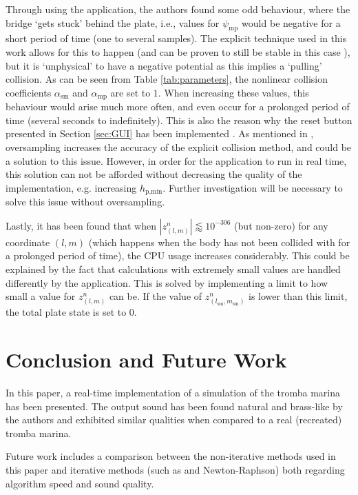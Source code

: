 \documentclass[dvipsnames, pdftex]{article}
\def\SWcomment[#1]{\textcolor{Bittersweet}{#1}}
\def\up{z}
\begin{document}
Through using the application, the authors found some odd behaviour, where the bridge `gets stuck' behind the plate, i.e., values for $\psi_\text{mp}$ would be negative for a short period of time (one to several samples). The explicit technique used in this work allows for this to happen (and can be proven to still be stable in this case \cite{Ducceschi2019}), but it is `unphysical' to have a negative potential as this implies a `pulling' collision. As can be seen from Table \ref{tab:parameters}, the nonlinear collision coefficients $\alpha_\text{sm}$ and $\alpha_\text{mp}$ are set to $1$. When increasing these values, this behaviour would arise much more often, and even occur for a prolonged period of time (several seconds to indefinitely). This is also the reason why the reset button presented in Section \ref{sec:GUI} has been implemented%
. As mentioned in \cite{Ducceschi2019}, oversampling increases the accuracy of the explicit collision method, and could be a solution to this issue. However, in order for the application to run in real time, this solution can not be afforded without decreasing the quality of the implementation, e.g. increasing $h_{\text{p},\text{min}}$. Further investigation will be necessary to solve this issue without oversampling.

Lastly, it has been found that when $|\up_{(l,m)}^n| \lessapprox 10^{-306}$ (but non-zero) for any coordinate $(l,m)$ (which happens when the body has not been collided with for a prolonged period of time), the CPU usage increases considerably. This could be explained by the fact that calculations with extremely small values are handled differently by the application.  %
This is solved by implementing a limit to how small a value for $\up_{(l,m)}^n$ can be. If the value of $\up_{(l_\text{sm},m_\text{sm})}^n$ is lower than this limit, the total plate state is set to $0$. 

\section{Conclusion and Future Work}\label{sec:conclusion}
In this paper, a real-time implementation of a simulation of the tromba marina has been presented. The output sound has been found natural and brass-like by the authors and exhibited similar qualities when compared to a real (recreated) tromba marina.

Future work includes a comparison between the non-iterative methods used in this paper and iterative methods (such as and Newton-Raphson) both regarding algorithm speed and sound quality. 
\end{document}
